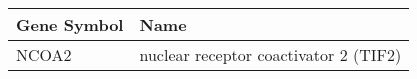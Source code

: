 \begin{tabular}{ll}
\toprule
Gene Symbol &                                  Name \\
\midrule
      NCOA2 & nuclear receptor coactivator 2 (TIF2) \\
\bottomrule
\end{tabular}
